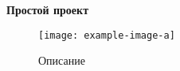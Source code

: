 \documentclass[a4paper, 12pt]{article}
\begin{document}
    \begin{center}
        \Large\textbf{Простой проект}
    \end{center}


    \blindtext\cite{ahu61} \par

    \begin{figure} [h!]
        \centering
        \texttt{[image: example-image-a]}
        \label{fig:example}
        \caption{Описание}
    \end{figure}

    \blindtext\cite{ab94} 

    \printbibliography
     
\end{document}
